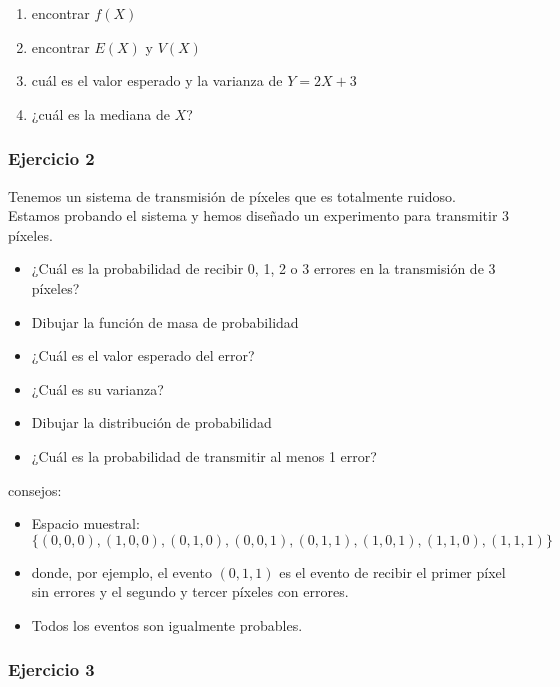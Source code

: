 \documentclass[
]{book}
\providecommand{\tightlist}{%
  \setlength{\itemsep}{0pt}\setlength{\parskip}{0pt}}
\begin{document}
\begin{enumerate}
\def\labelenumi{\alph{enumi})}
\tightlist
\item
  encontrar \(f(X)\)
\item
  encontrar \(E(X)\) y \(V(X)\)
\item
  cuál es el valor esperado y la varianza de \(Y=2X+3\)
\item
  ¿cuál es la mediana de \(X\)?
\end{enumerate}

\hypertarget{ejercicio-2-3}{%
\subsubsection{Ejercicio 2}\label{ejercicio-2-3}}

Tenemos un sistema de transmisión de píxeles que es totalmente ruidoso. Estamos probando el sistema y hemos diseñado un experimento para transmitir 3 píxeles.

\begin{itemize}
\item
  ¿Cuál es la probabilidad de recibir 0, 1, 2 o 3 errores en la transmisión de 3 píxeles?
\item
  Dibujar la función de masa de probabilidad
\item
  ¿Cuál es el valor esperado del error?
\item
  ¿Cuál es su varianza?
\item
  Dibujar la distribución de probabilidad
\item
  ¿Cuál es la probabilidad de transmitir al menos 1 error?
\end{itemize}

consejos:

\begin{itemize}
\item
  Espacio muestral: \(\{(0,0,0), (1,0,0), (0,1,0), (0,0,1), (0,1,1), (1, 0,1), (1,1,0), (1,1,1)\}\)
\item
  donde, por ejemplo, el evento \((0,1,1)\) es el evento de recibir el primer píxel sin errores y el segundo y tercer píxeles con errores.
\item
  Todos los eventos son igualmente probables.
\end{itemize}

\hypertarget{ejercicio-3-1}{%
\subsubsection{Ejercicio 3}\label{ejercicio-3-1}}
\end{document}
